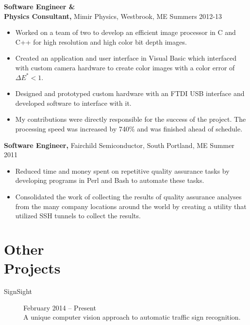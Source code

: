 \documentclass[margin]{res}
\begin{document}
\begin{minipage}{\textwidth}
\begin{resume}
{\bf Software Engineer \& \\ Physics Consultant,} Mimir Physics, Westbrook, ME \hfill Summers 2012-13
 \begin{itemize} \itemsep -2pt  %
 \item Worked on a team of two to develop an efficient image processor in C and C++ for high resolution and high color bit depth images. %
 \item Created an application and user interface in Visual Basic which interfaced with custom camera hardware to create color images with a color error of $\Delta E^* < 1$. %
 \item Designed and prototyped custom hardware with an FTDI USB interface  and developed software to interface with it.
 \item My contributions were directly responsible for the success of the project. The processing speed was increased by 740\% and was finished ahead of schedule. \\
 \end{itemize}

 
 
{\bf Software Engineer,} Fairchild Semiconductor, South Portland, ME \hfill  Summer 2011
\begin{itemize} \itemsep -2pt %
 \item Reduced time and money spent on repetitive quality assurance tasks by developing programs in Perl and Bash to automate these tasks.
 \item Consolidated the work of collecting the results of quality assurance analyses from the many company locations around the world by creating a utility that utilized SSH tunnels to collect the results.
\end{itemize}

\section{Other \\ Projects}
\begin{description}
	\item[SignSight] \hfill February 2014 -- Present \\
		A unique computer vision approach to automatic traffic sign recognition.
\end{description}


\end{resume}
\end{minipage}
\end{document}
